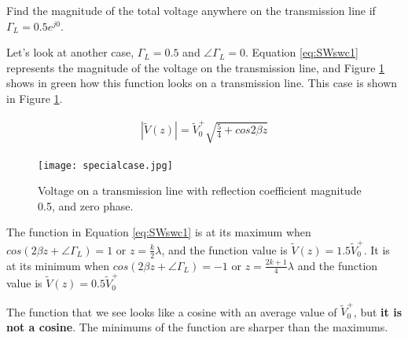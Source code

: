 \documentclass{ximera}
\begin{document}
\begin{example}

Find the magnitude of the total voltage anywhere on the transmission line if $\Gamma_L=0.5 e^{j0}$.

\begin{explanation}
\item Let's look at another case,  $\Gamma_L=0.5$ and $\angle \Gamma_L=0$. Equation \ref{eq:SWswc1}  represents the magnitude of the voltage on the transmission line, and Figure \ref{fig:SWreflcoeffvid} shows in green how this function looks on a transmission line. This case is shown in Figure \ref{fig:SWreflcoeffvid}. 

\begin{eqnarray}
|\tilde{V}(z)|=\tilde{V}_0^+ \sqrt{\frac{5}{4}+ cos{2 \beta z} }\label{eq:SWswc1}
\end{eqnarray}

\begin{figure}[htbp]
\begin{center}
\texttt{[image: specialcase.jpg]}
\end{center}
\caption{Voltage on a transmission line with reflection coefficient magnitude 0.5, and zero phase.}
\label{fig:SWreflcoeffvid}
\end{figure}



The function in Equation \ref{eq:SWswc1} is at its maximum 
when $cos(2 \beta z+\angle \Gamma_L)=1$ or $z=\frac{k}{2} \lambda$, and the function
value is $\tilde{V}(z)=1.5\tilde{V}_0^+  $. It is at its
minimum when  $cos(2 \beta z+ \angle \Gamma_L)=-1$ or $z=\frac{2 k +1}{4} \lambda$
and the function value is $\tilde{V}(z)=0.5 \tilde{V}_0^+$

The function that we see looks
like a cosine with an average value of $ \tilde{V}_0^+ $, but {\bf it is not a cosine}.
The minimums of the function are sharper than the maximums. 



\end{explanation}
\end{example}
\end{document}
